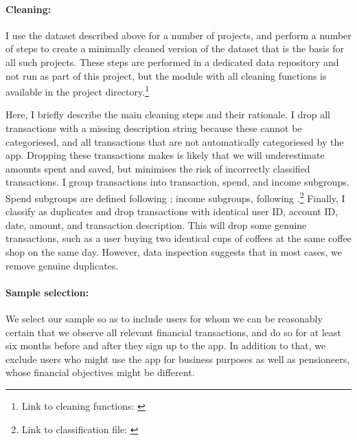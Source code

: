 \paragraph{Cleaning:}%
\label{par:cleaning}

I use the dataset described above for a number of projects, and perform a
number of steps to create a minimally cleaned version of the dataset that is
the basis for all such projects. These steps are performed in a dedicated
data repository and not run as part of this project, but the module with
all cleaning functions is available in the project directory.\footnote{Link to
    cleaning functions:
\href{https:/egithub.com/fabiangunzinger/mdb_eval/blob/f51e49c95c5884d2dc417be23921a8acd85aec9d/src/data/clean.py}{\faGithub}}

Here, I briefly describe the main cleaning steps and their rationale. I drop
all transactions with a missing description string because these cannot be
categoriesed, and all transactions that are not automatically categoriesed by
the app. Dropping these transactions makes is likely that we will underestimate
amounts spent and saved, but minimises the risk of incorrectly classified
transactions. I group transactions into transaction, spend, and income
subgroups. Spend subgroups are defined following \citet{muggleton2020evidence};
income subgroups, following \citet{hacioglu2021distributional}.\footnote{Link
to classification file:
\href{https://github.com/fabiangunzinger/mdb_eval/blob/92af366d4c4052cc7a7f78a6178086de8ecdfb75/src/data/txn_classifications.py}{\faGithub}}
Finally, I classify as duplicates and drop transactions with identical user ID,
account ID, date, amount, and transaction description. This will drop some
genuine transactions, such as a user buying two identical cups of coffees at
the same coffee shop on the same day. However, data inspection suggests that in
most cases, we remove genuine duplicates.


\paragraph{Sample selection:}%
\label{par:sample_selection}

We select our sample so as to include users for whom we can be reasonably
certain that we observe all relevant financial transactions, and do so for at
least six months before and after they sign up to the app. In addition to that,
we exclude users who might use the app for business purposes as well as
pensioneers, whose financial objectives might be different.

